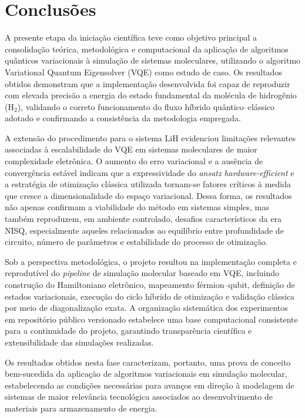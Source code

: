 \section{Conclusões}

A presente etapa da iniciação científica teve como objetivo principal a 
consolidação teórica, metodológica e computacional da aplicação de 
algoritmos quânticos variacionais à simulação de sistemas moleculares, 
utilizando o algoritmo Variational Quantum Eigensolver (VQE) como estudo de 
caso. Os resultados obtidos demonstram que a implementação desenvolvida foi 
capaz de reproduzir com elevada precisão a energia do estado fundamental da 
molécula de hidrogênio (H$_2$), validando o correto funcionamento do fluxo 
híbrido quântico--clássico adotado e confirmando a consistência da 
metodologia empregada.

A extensão do procedimento para o sistema LiH evidenciou limitações 
relevantes associadas à escalabilidade do VQE em sistemas moleculares de 
maior complexidade eletrônica. O aumento do erro variacional e a ausência de 
convergência estável indicam que a expressividade do \textit{ansatz} 
\textit{hardware-efficient} e a estratégia de otimização clássica utilizada 
tornam-se fatores críticos à medida que cresce a dimensionalidade do espaço 
variacional. Dessa forma, os resultados não apenas confirmam a viabilidade 
do método em sistemas simples, mas também reproduzem, em ambiente 
controlado, desafios característicos da era NISQ, especialmente aqueles 
relacionados ao equilíbrio entre profundidade de circuito, número de 
parâmetros e estabilidade do processo de otimização.

Sob a perspectiva metodológica, o projeto resultou na implementação completa 
e reprodutível do \textit{pipeline} de simulação molecular baseado em VQE, 
incluindo construção do Hamiltoniano eletrônico, mapeamento férmion--qubit, 
definição de estados variacionais, execução do ciclo híbrido de otimização e 
validação clássica por meio de diagonalização exata. A organização 
sistemática dos experimentos em repositório público versionado estabelece 
uma base computacional consistente para a continuidade do projeto, 
garantindo transparência científica e extensibilidade das simulações 
realizadas.

Os resultados obtidos nesta fase caracterizam, portanto, uma prova de 
conceito bem-sucedida da aplicação de algoritmos variacionais em simulação 
molecular, estabelecendo as condições necessárias para avanços em direção à 
modelagem de sistemas de maior relevância tecnológica associados ao 
desenvolvimento de materiais para armazenamento de energia.

